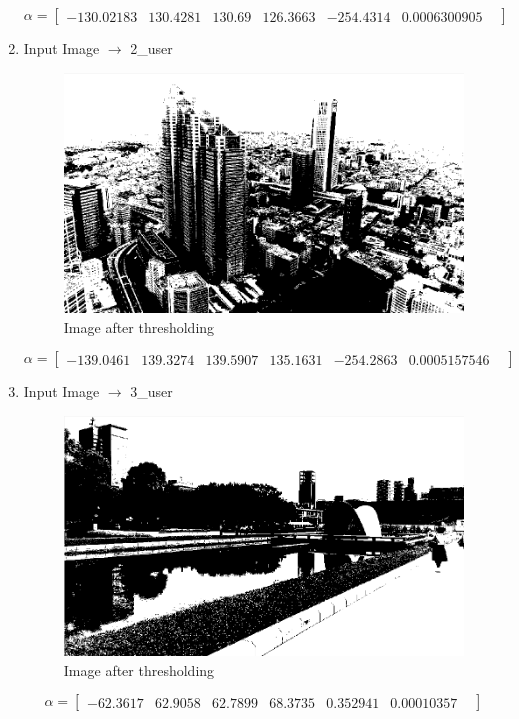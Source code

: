 \documentclass{article}
\begin{document}
\begin{enumerate}
    \[
    \alpha=
    \begin{bmatrix} 
    -130.02183 &
    130.4281 &
    130.69 &
    126.3663 &
    -254.4314 &
    0.0006300905 &
    \end{bmatrix}
    \]
    \item Input Image $\longrightarrow$ 2{\_}user
    \begin{figure}[H]
        \centering
        \includegraphics[width=0.75\linewidth]{3.png}
        \caption{Image after thresholding}
        \label{fig:Image after thresholding}
    \end{figure}
    \[
    \alpha=
    \begin{bmatrix} 
     -139.0461 &
     139.3274 &
     139.5907 &
     135.1631 &
     -254.2863 &
     0.0005157546 &
    \end{bmatrix}
    \]
    \item Input Image $\longrightarrow$ 3{\_}user
    \begin{figure}[H]
        \centering
        \includegraphics[width=0.75\linewidth]{4.png}
        \caption{Image after thresholding}
        \label{fig:Image after thresholding}
    \end{figure}
    \[
    \alpha=
    \begin{bmatrix} 
     -62.3617 &
     62.9058 &
     62.7899 &
     68.3735 &
     0.352941 &
     0.00010357 &
    \end{bmatrix}
    \]
    \end{enumerate}
\end{document}
